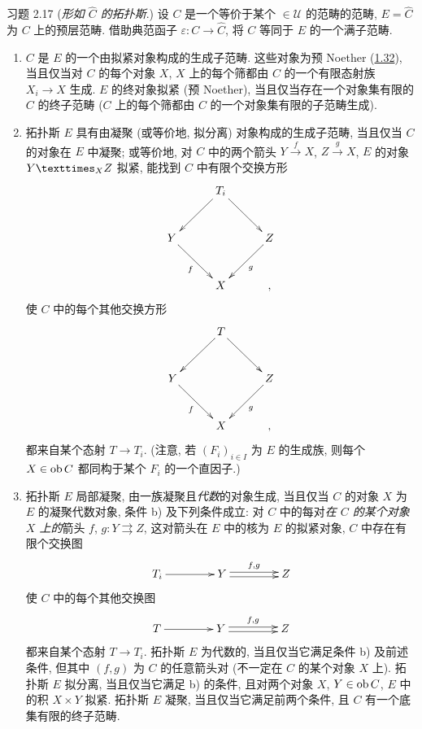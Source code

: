 \begin{enonce*}[remark]{习题 2.17}
(\emph{形如 $\widehat{C}$ 的拓扑斯}.)
设 $C$ 是一个等价于某个 $\in 𝒰$ 的范畴的范畴,
$E = \widehat{C}$ 为 $C$ 上的预层范畴.
借助典范函子 $\varepsilon : C \to \widehat{C}$,
将 $C$ 等同于 $E$ 的一个满子范畴.
\begin{enumerate}
\renewcommand{\theenumi}{\alph {enumi}}
\renewcommand{\labelenumi}{(\theenumi)}
\item $C$ 是\pageoriginale{} $E$ 的一个由拟紧对象构成的生成子范畴.
这些对象为预 Noether
(\cf \hyperref[VI.subsec1.32]{1.32}),
当且仅当对 $C$ 的每个对象 $X$,
$X$ 上的每个筛都由 $C$ 的一个有限态射族 $X_i \to X$ 生成.
$E$ 的终对象拟紧 (\resp 预 Noether),
当且仅当存在一个对象集有限的 $C$ 的终子范畴
(\resp $C$ 上的每个筛都由 $C$ 的一个对象集有限的子范畴生成).

\item 拓扑斯 $E$ 具有由凝聚
(或等价地, 拟分离) 对象构成的生成子范畴,
当且仅当 $C$ 的对象在 $E$ 中凝聚;
或等价地, 对 $C$ 中的两个箭头
$Y \xrightarrow{f} X$, $Z \xrightarrow{g} X$,
$E$ 的对象 $\fprod{Y}{Z}{X}$ 拟紧,
\ie 能找到 $C$ 中有限个交换方形
\[
\xymatrix@=1cm{
 & T_i \ar[ld] \ar[rd]& \\
Y\ar[rd]_{f}&    & Z\ar[ld]^{g}\\
 & X  &,
}
\]
使 $C$ 中的每个其他交换方形
\[
\xymatrix@=1cm{
 & T \ar[ld] \ar[rd]& \\
Y\ar[rd]_{f}&    & Z\ar[ld]^{g}\\
 & X  &,
}
\]
都来自\pageoriginale{}某个态射 $T \to T_i$.
(注意, 若 $(F_i)_{i \in I}$ 为 $E$ 的生成族,
则每个 $X \in \operatorname{ob} C$ 都同构于某个 $F_i$ 的一个直因子.)

\item 拓扑斯 $E$ 局部凝聚,
\ie 由一族凝聚且\emph{代数}的对象生成,
当且仅当 $C$ 的对象 $X$ 为 $E$ 的凝聚代数对象,
\ie 条件 b) 及下列条件成立:
对 $C$ 中的每对\emph{在 $C$ 的某个对象 $X$ 上的}箭头
$f$, $g : Y \rightrightarrows Z$,
这对箭头在 $E$ 中的核为 $E$ 的拟紧对象,
\ie $C$ 中存在有限个交换图
\[
\xymatrix@C=1.5cm{
T_i \ar[r]& Y \ar@<2pt>[r]^{f,g}\ar@<-2pt>[r]&Z
}
\]
使 $C$ 中的每个其他交换图
\[
\xymatrix@C=1.5cm{
T \ar[r]& Y \ar@<2pt>[r]^{f,g}\ar@<-2pt>[r]&Z
}
\]
都来自某个态射 $T \to T_i$.
拓扑斯 $E$ 为代数的,
当且仅当它满足条件 b) 及前述条件,
但其中 $(f, g)$ 为 $C$ 的任意箭头对
(不一定在 $C$ 的某个对象 $X$ 上).
拓扑斯 $E$ 拟分离,
当且仅当它满足 b) 的条件,
且对两个对象 $X$, $Y\in\operatorname{ob} C$,
$E$ 中的积 $X\times Y$ 拟紧.
拓扑斯 $E$ 凝聚,
当且仅当它满足前两个条件,
且 $C$ 有一个底集有限的终子范畴.


\end{enumerate}
\end{enonce*}

